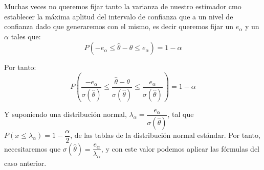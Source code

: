 Muchas veces no queremos fijar tanto la varianza de nuestro estimador
cmo establecer la m\'axima aplitud del intervalo de confianza que a
un nivel de confianza dado que generaremos con el mismo, es decir
queremos fijar un $e_{\alpha}$ y un $\alpha$ tales que: 
\[
P\left(-e_{\alpha}\leq\hat{\theta}-\theta\leq e_{\alpha}\right)=1-\alpha
\]


Por tanto:
\[
P\left(\dfrac{-e_{\alpha}}{\sigma\left(\hat{\theta}\right)}\leq\dfrac{\hat{\theta}-\theta}{\sigma\left(\hat{\theta}\right)}\leq\dfrac{e_{\alpha}}{\sigma\left(\hat{\theta}\right)}\right)=1-\alpha
\]


Y suponiendo una distribuci\'on normal, $\lambda_{\alpha}=\dfrac{e_{\alpha}}{\sigma\left(\hat{\theta}\right)}$,
tal que $P\left(x\leq\lambda_{\alpha}\right)=1-\dfrac{\alpha}{2}$,
de las tablas de la distribuci\'on normal est\'andar. Por tanto, necesitaremos
que $\sigma\left(\hat{\theta}\right)=\dfrac{e_{\alpha}}{\lambda_{\alpha}}$,
y con este valor podemos aplicar las f\'ormulas del caso anterior.%

